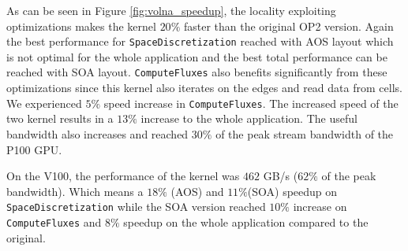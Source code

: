 As can be seen in Figure \ref{fig:volna_speedup}, the locality exploiting 
optimizations makes the kernel $20\%$ faster than the original OP2 version.
Again the best performance for \texttt{SpaceDiscretization} reached with AOS 
layout which is not optimal for the whole application and the best total performance
can be reached with SOA layout. \texttt{ComputeFluxes} also benefits significantly from these optimizations since this kernel also iterates on the edges and read data from cells. We experienced $5\%$ speed increase in \texttt{ComputeFluxes}.
The increased speed of the two kernel results in a $13\%$ increase to the whole
application. The useful bandwidth also increases and reached $30\%$ of the peak
stream bandwidth of the P100 GPU.

On the V100, the performance of the kernel was $462$ GB/s ($62\%$ of the peak bandwidth).
Which means a $18\%$ (AOS) and $11\%$(SOA) speedup on \texttt{SpaceDiscretization}
while the SOA version reached $10\%$ increase on \texttt{ComputeFluxes} and $8\%$
speedup on the whole application compared to the original.



